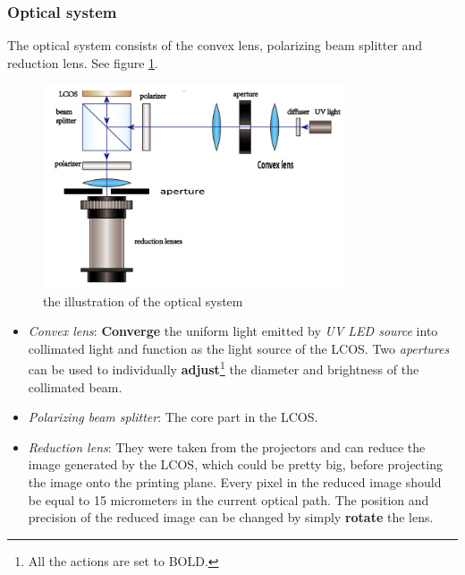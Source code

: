 \documentclass[a4paper]{article}
\begin{document}
\subsubsection{Optical system}
The optical system consists of the convex lens, polarizing beam splitter and reduction lens. See figure 
\ref{figure_optical_path}.
\begin{figure}
  \centering
  \includegraphics[width=0.8\textwidth]{lightpath.PNG}
  \caption{the illustration of the optical system}\label{figure_optical_path}
\end{figure}
\begin{itemize}
\item \textit{Convex lens}:
  \textbf{Converge} the uniform light emitted by \textit{UV LED source} into collimated light and function as the light 
  source of the LCOS. Two \textit{apertures} can be used to individually \textbf{adjust}\footnote{All the actions are set 
    to BOLD.} the diameter and brightness of the collimated beam.
\item \textit{Polarizing beam splitter}:
  The core part in the LCOS.
\item \textit{Reduction lens}:
  They were taken from the projectors and can reduce the image generated by the LCOS, which could be pretty big, before 
  projecting the image onto the printing plane. Every pixel in the reduced image should be equal to 15 micrometers in the 
  current optical path. The position and precision of the reduced image can be changed by simply \textbf{rotate} the lens.
\end{itemize}
\end{document}

